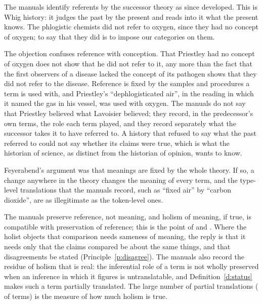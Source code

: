 \documentclass{situationist-preprint}
\begin{document}
\begin{objection}
The manuals identify referents by the successor theory as since developed. This is Whig history: it judges the past by the present and reads into it what the present knows. The phlogistic chemists did not refer to oxygen, since they had no concept of oxygen; to say that they did is to impose our categories on them.
\end{objection}

\begin{reply}
The objection confuses reference with conception. That Priestley had no concept of oxygen does not show that he did not refer to it, any more than the fact that the first observers of a disease lacked the concept of its pathogen shows that they did not refer to the disease. Reference is fixed by the samples and procedures a term is used with, and Priestley's \enquote{dephlogisticated air}, in the reading in which it named the gas in his vessel, was used with oxygen. The manuals do not say that Priestley believed what Lavoisier believed; they record, in the predecessor's own terms, the role each term played, and they record separately what the successor takes it to have referred to. A history that refused to say what the past referred to could not say whether its claims were true, which is what the historian of science, as distinct from the historian of opinion, wants to know.
\end{reply}

\begin{objection}
Feyerabend's argument was that meanings are fixed by the whole theory. If so, a change anywhere in the theory changes the meaning of every term, and the type-level translations that the manuals record, such as \enquote{fixed air} by \enquote{carbon dioxide}, are as illegitimate as the token-level ones.
\end{objection}

\begin{reply}
The manuals preserve reference, not meaning, and holism of meaning, if true, is compatible with preservation of reference; this is the point of \citet{Scheffler1967} and \citet{Devitt1979}. Where the holist objects that comparison needs sameness of meaning, the reply is that it needs only that the claims compared be about the same things, and that disagreements be stated (Principle~\ref{p:disagree}). The manuals also record the residue of holism that is real: the inferential role of a term is not wholly preserved when an inference in which it figures is untranslatable, and Definition~\ref{d:status} makes such a term partially translated. The large number of partial translations (\nstatP{} of \ntermsall{} terms) is the measure of how much holism is true.
\end{reply}
\end{document}
